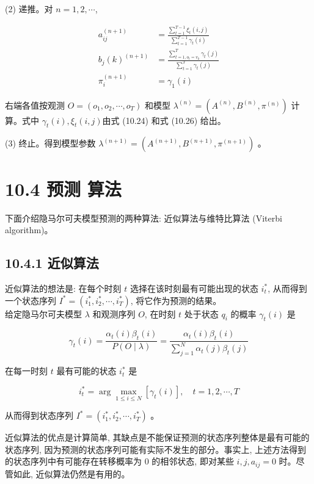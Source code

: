 \documentclass[10pt]{article}
\begin{document}
(2) 递推。对 $n=1,2, \cdots$,

$$
\begin{aligned}
a_{i j}^{(n+1)} & =\frac{\sum_{t=1}^{T-1} \xi_{t}(i, j)}{\sum_{t=1}^{T-1} \gamma_{t}(i)} \\
b_{j}(k)^{(n+1)} & =\frac{\sum_{t=1, o_{t}=v_{k}}^{T} \gamma_{t}(j)}{\sum_{t=1}^{T} \gamma_{t}(j)} \\
\pi_{i}^{(n+1)} & =\gamma_{1}(i)
\end{aligned}
$$

右端各值按观测 $O=\left(o_{1}, o_{2}, \cdots, o_{T}\right)$ 和模型 $\lambda^{(n)}=\left(A^{(n)}, B^{(n)}, \pi^{(n)}\right)$ 计算。式中 $\gamma_{t}(i), \xi_{t}(i, j)$由式 (10.24) 和式 (10.26) 给出。

(3) 终止。得到模型参数 $\lambda^{(n+1)}=\left(A^{(n+1)}, B^{(n+1)}, \pi^{(n+1)}\right)$ 。

\section*{10.4 预测 算法}
下面介绍隐马尔可夫模型预测的两种算法: 近似算法与维特比算法 (Viterbi algorithm)。

\subsection*{10.4.1 近似算法}
近似算法的想法是: 在每个时刻 $t$ 选择在该时刻最有可能出现的状态 $i_{t}^{*}$, 从而得到一个状态序列 $I^{*}=\left(i_{1}^{*}, i_{2}^{*}, \cdots, i_{T}^{*}\right)$, 将它作为预测的结果。\\
给定隐马尔可夫模型 $\lambda$ 和观测序列 $O$, 在时刻 $t$ 处于状态 $q_{i}$ 的概率 $\gamma_{t}(i)$ 是


\begin{equation*}
\gamma_{t}(i)=\frac{\alpha_{t}(i) \beta_{t}(i)}{P(O \mid \lambda)}=\frac{\alpha_{t}(i) \beta_{t}(i)}{\sum_{j=1}^{N} \alpha_{t}(j) \beta_{t}(j)} \tag{10.42}
\end{equation*}


在每一时刻 $t$ 最有可能的状态 $i_{t}^{*}$ 是


\begin{equation*}
i_{t}^{*}=\arg \max _{1 \leqslant i \leqslant N}\left[\gamma_{t}(i)\right], \quad t=1,2, \cdots, T \tag{10.43}
\end{equation*}


从而得到状态序列 $I^{*}=\left(i_{1}^{*}, i_{2}^{*}, \cdots, i_{T}^{*}\right)$ 。

近似算法的优点是计算简单, 其缺点是不能保证预测的状态序列整体是最有可能的状态序列, 因为预测的状态序列可能有实际不发生的部分。事实上, 上述方法得到的状态序列中有可能存在转移概率为 0 的相邻状态, 即对某些 $i, j, a_{i j}=0$ 时。尽管如此, 近似算法仍然是有用的。
\end{document}

